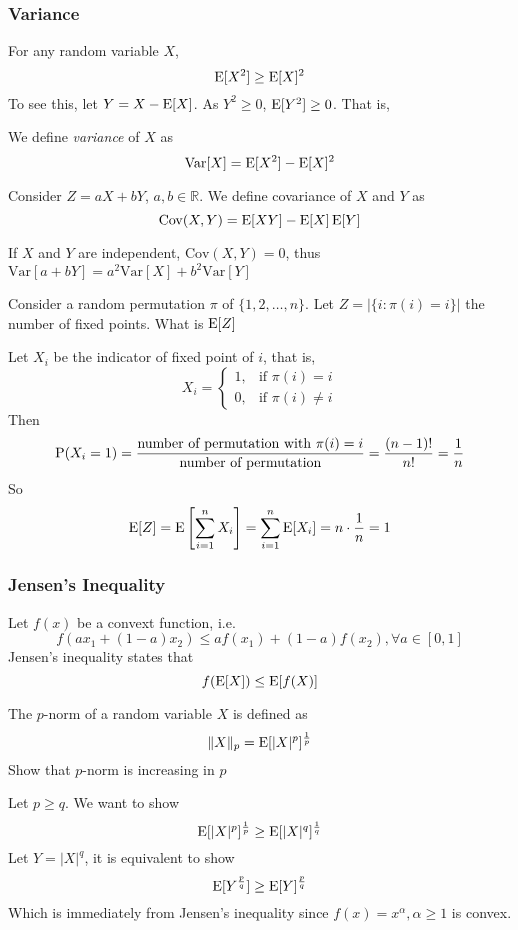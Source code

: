 \subsubsection{Variance}
For any random variable $X$, 
$$\E[X^2] \geq \E[X]^2$$
To see this, let $Y=X-\E[X]$. As $Y^2\geq 0$, $\E[Y^2] \geq 0$. That is,

We define \textit{variance} of $X$ as 
$$\mathrm{Var}[X] = \E[X^2] - \E[X]^2$$

Consider $Z=aX+bY$, $a,b \in \mathbb{R}$.
We define covariance of $X$ and $Y$ as 
$$\mathrm{Cov}(X,Y) = \E[XY]-\E[X]\E[Y]$$

If $X$ and $Y$ are independent, $\mathrm{Cov}(X,Y) = 0$, thus $\mathrm{Var}[a+bY] = a^2\mathrm{Var}[X]+b^2\mathrm{Var}[Y]$

\begin{excr}{}
Consider a random permutation $\pi$ of $\{1,2,\ldots,n\}$. Let $Z = \left| \{i: \pi(i) = i \} \right|$ the number of fixed points. What is $\E[Z]$
\end{excr}

\begin{soln}{}
Let $X_i$ be the indicator of fixed point of $i$, that is,
$$X_i = \begin{cases} 1, & \textrm{if $\pi(i) = i$}\\
	0, & \textrm{if $\pi(i) \neq i$}
\end{cases}
$$
Then
$$\P(X_i = 1) = \frac{\textrm{number of permutation with $\pi(i) = i$}}{\textrm{number of permutation}}=\frac{(n-1)!}{n!} = \frac{1}{n}$$
So
$$\E[Z] = \E\left[\sum_{i=1}^n X_i\right]=\sum_{i=1}^n \E[X_i] =n\cdot \frac{1}{n} = 1$$
\end{soln}

\subsubsection{Jensen's Inequality}
Let $f(x)$ be a convext function, i.e.
$$f(ax_1+(1-a)x_2)\leq af(x_1)+(1-a)f(x_2), \forall a\in [0,1]$$
Jensen's inequality states that
$$f(\E[X])\leq \E[f(X)]$$

\begin{excr}{}
The $p$-norm of a random variable $X$ is defined as 
$$\|X\|_p = \E[|X|^p]^\frac{1}{p}$$
Show that $p$-norm is increasing in $p$
\end{excr}
\begin{soln}
Let $p\geq q$. We want to show
$$\E[|X|^p]^\frac{1}{p} \geq \E[|X|^q]^\frac{1}{q}$$
Let $Y=|X|^q$, it is equivalent to show
$$\E[Y^\frac{p}{q}] \geq \E[Y]^\frac{p}{q}$$
Which is immediately from Jensen's inequality since $f(x)=x^\alpha, \alpha \geq 1$ is convex.
\end{soln}

